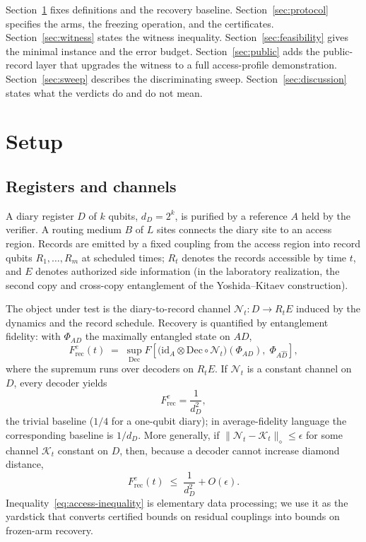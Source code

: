 \documentclass[11pt]{article}
\newcommand{\cN}{\mathcal N}
\newcommand{\cK}{\mathcal K}
\newcommand{\Frec}{F^{e}_{\mathrm{rec}}}
\begin{document}
Section~\ref{sec:setup} fixes definitions and the recovery baseline.
Section~\ref{sec:protocol} specifies the arms, the freezing
operation, and the certificates.  Section~\ref{sec:witness} states
the witness inequality.  Section~\ref{sec:feasibility} gives the
minimal instance and the error budget.  Section~\ref{sec:public}
adds the public-record layer that upgrades the witness to a full
access-profile demonstration.  Section~\ref{sec:sweep} describes the
discriminating sweep.  Section~\ref{sec:discussion} states what the
verdicts do and do not mean.

\section{Setup}
\label{sec:setup}

\subsection{Registers and channels}

A diary register $D$ of $k$ qubits, $d_D = 2^k$, is purified by a
reference $A$ held by the verifier.  A routing medium $B$ of $L$
sites connects the diary site to an access region.  Records are
emitted by a fixed coupling from the access region into record
qubits $R_1,\dots,R_m$ at scheduled times; $R_t$ denotes the records
accessible by time $t$, and $E$ denotes authorized side information
(in the laboratory realization, the second copy and cross-copy
entanglement of the Yoshida--Kitaev construction).

The object under test is the diary-to-record channel
$\cN_t : D \to R_t E$ induced by the dynamics and the record
schedule.  Recovery is quantified by entanglement fidelity: with
$\Phi_{AD}$ the maximally entangled state on $AD$,
\begin{equation}
  \Frec(t)
  \;=\;
  \sup_{\mathrm{Dec}}
  F\!\left[
    \big( \mathrm{id}_A \otimes \mathrm{Dec}\circ \cN_t \big)(\Phi_{AD}),
    \;\Phi_{A\hat D}
  \right],
\end{equation}
where the supremum runs over decoders on $R_t E$.  If $\cN_t$ is a
constant channel on $D$, every decoder yields
\begin{equation}
  \Frec = \frac{1}{d_D^2},
  \label{eq:baseline}
\end{equation}
the trivial baseline ($1/4$ for a one-qubit diary); in
average-fidelity language the corresponding baseline is $1/d_D$.
More generally, if $\|\cN_t - \cK_t\|_\diamond \le \epsilon$ for some
channel $\cK_t$ constant on $D$, then, because a decoder cannot
increase diamond distance,
\begin{equation}
  \Frec(t) \;\le\; \frac{1}{d_D^2} + O(\epsilon).
  \label{eq:access-inequality}
\end{equation}
Inequality~\eqref{eq:access-inequality} is elementary data
processing; we use it as the yardstick that converts certified bounds
on residual couplings into bounds on frozen-arm recovery.
\end{document}
